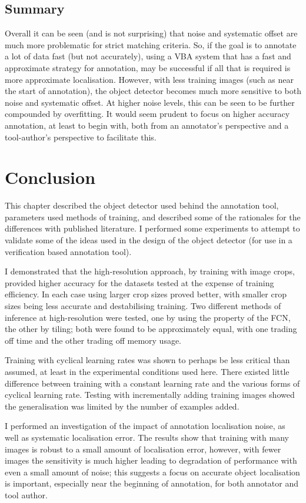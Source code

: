 \subsection{Summary}

Overall it can be seen (and is not surprising) that noise and systematic offset are much more problematic for strict matching criteria. So, if the goal is to annotate a lot of data fast (but not accurately), using a \gls{VBA} system that has a fast and approximate strategy for annotation, may be successful if all that is required is more approximate localisation. However, with less training images (such as near the start of annotation), the object detector becomes much more sensitive to both noise and systematic offset. At higher noise levels, this can be seen to be further compounded by overfitting. It would seem prudent to focus on higher accuracy annotation, at least to begin with, both from an annotator's perspective and a tool-author's perspective to facilitate this.

\section {Conclusion}

This chapter described the object detector used behind the annotation tool, parameters used methods of training, and described some of the rationales for the differences with published literature. I performed some experiments to attempt to validate some of the ideas used in the design of the object detector (for use in a verification based annotation tool).

I demonstrated that the high-resolution approach, by training with image crops, provided higher accuracy for the datasets tested at the expense of training efficiency. In each case using larger crop sizes proved better, with smaller crop sizes being less accurate and destabilising training. Two different methods of inference at high-resolution were tested, one by using the property of the \gls{FCN}, the other by tiling; both were found to be approximately equal, with one trading off time and the other trading off memory usage.

Training with cyclical learning rates was shown to perhaps be less critical than assumed, at least in the experimental conditions used here. There existed little difference between training with a constant learning rate and the various forms of cyclical learning rate. Testing with incrementally adding training images showed the generalisation was limited by the number of examples added.

I performed an investigation of the impact of annotation localisation noise, as well as systematic localisation error. The results show that training with many images is robust to a small amount of localisation error, however, with fewer images the sensitivity is much higher leading to degradation of performance with even a small amount of noise; this suggests a focus on accurate object localisation is important, especially near the beginning of annotation, for both annotator and tool author.



